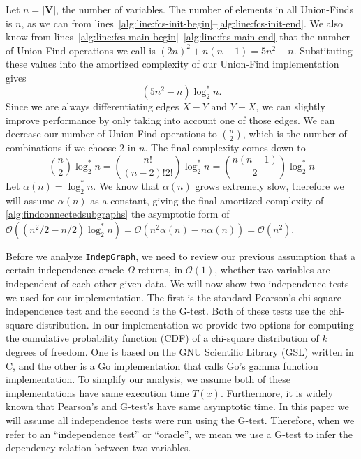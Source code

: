 \documentclass{amsart}
\theoremstyle{plain}
\numberwithin{equation}{section}
\newcommand{\set}[1]{\mathbf{#1}}
\newcommand{\bigo}{\mathcal{O}}
\newcommand{\code}[1]{\lstinline[mathescape=true]{#1}}
\begin{document}
Let $n=|\set{V}|$, the number of variables. The number of elements in all Union-Finds is
$n$, as we can from lines~\ref{alg:line:fcs-init-begin}--\ref{alg:line:fcs-init-end}. We also know
from lines~\ref{alg:line:fcs-main-begin}--\ref{alg:line:fcs-main-end} that the number of Union-Find
operations we call is ${(2n)}^2+n(n-1)=5n^2-n$. Substituting these values into the amortized
complexity of our Union-Find implementation gives
\begin{equation*}
  (5n^2-n)\log_2^*n.
\end{equation*}
Since we are always differentiating edges $X-Y$ and $Y-X$, we can slightly improve performance by
only taking into account one of those edges. We can decrease our number of Union-Find operations to
$\binom{n}{2}$, which is the number of combinations if we choose $2$ in $n$. The final complexity
comes down to
\begin{equation*}
  \binom{n}{2}\log_2^*n=\left(\frac{n!}{(n-2)!2!}\right)\log_2^*n=\left(\frac{n(n-1)}{2}\right)
    \log_2^*n
\end{equation*}
Let $\alpha(n)=\log_2^*n$. We know that $\alpha(n)$ grows extremely slow, therefore we will assume
$\alpha(n)$ as a constant, giving the final amortized complexity of
\autoref{alg:findconnectedsubgraphs} the asymptotic form of $\bigo((n^2/2-n/2)\log_2^*n)=
\bigo(n^2\alpha(n)-n\alpha(n))=\bigo(n^2)$.

Before we analyze \code{IndepGraph}, we need to review our previous assumption that a certain
independence oracle $\Omega$ returns, in $\bigo(1)$, whether two variables are independent of each
other given data. We will now show two independence tests we used for our implementation. The first
is the standard Pearson's chi-square independence test and the second is the G-test. Both of these
tests use the chi-square distribution. In our implementation we provide two options for computing
the cumulative probability function (CDF) of a chi-square distribution of $k$ degrees of freedom.
One is based on the GNU Scientific Library (GSL) written in C, and the other is a Go implementation
that calls Go's gamma function implementation. To simplify our analysis, we assume both of these
implementations have same execution time $T(x)$. Furthermore, it is widely known that Pearson's and
G-test's have same asymptotic time. In this paper we will assume all independence tests were run
using the G-test. Therefore, when we refer to an ``independence test'' or ``oracle'', we mean we
use a G-test to infer the dependency relation between two variables.
\end{document}
